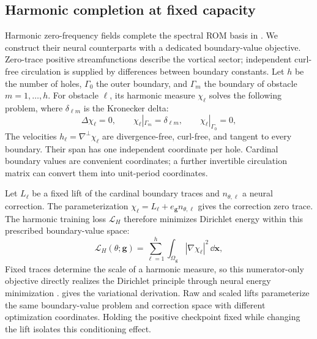 \subsection{Harmonic completion at fixed capacity}
\label{sec:rom}
{Harmonic zero-frequency fields complete the spectral ROM basis in \citet{liu2015model}. We construct their neural counterparts with a dedicated boundary-value objective. Zero-trace positive streamfunctions describe the vortical sector; independent curl-free circulation is supplied by differences between boundary constants. Let $h$ be the number of holes, $\Gamma_0$ the outer boundary, and $\Gamma_m$ the boundary of obstacle $m=1,\ldots,h$. For obstacle $\ell$, its harmonic measure $\chi_\ell$ solves the following problem, where $\delta_{\ell m}$ is the Kronecker delta:}
\begin{equation}
\Delta\chi_\ell=0,\qquad
\chi_\ell|_{\Gamma_m}=\delta_{\ell m},\qquad
\chi_\ell|_{\Gamma_0}=0,
\label{eq:harmonic-measure}
\end{equation}
The velocities $h_\ell=\nabla^\perp\chi_\ell$ are divergence-free, curl-free, and tangent to every boundary. Their span has one independent coordinate per hole. Cardinal boundary values are convenient coordinates; a further invertible circulation matrix can convert them into unit-period coordinates.

{Let $L_\ell$ be a fixed lift of the cardinal boundary traces and $n_{\theta,\ell}$ a neural correction. The parameterization $\chi_\ell=L_\ell+e_{\mathbf g}n_{\theta,\ell}$ gives the correction zero trace. The harmonic training loss $\mathcal L_H$ therefore minimizes Dirichlet energy within this prescribed boundary-value space:}
\begin{equation}
\mathcal L_H(\theta;\mathbf g)=\sum_{\ell=1}^{h}\int_{\Omega_{\mathbf g}}|\nabla\chi_\ell|^2\,\dd\mathbf x,
\label{eq:harmonic-loss}
\end{equation}
{Fixed traces determine the scale of a harmonic measure, so this numerator-only objective directly realizes the Dirichlet principle through neural energy minimization \citep{e2018deep}.  gives the variational derivation. Raw and scaled lifts parameterize the same boundary-value problem and correction space with different optimization coordinates. Holding the positive checkpoint fixed while changing the lift isolates this conditioning effect.}

